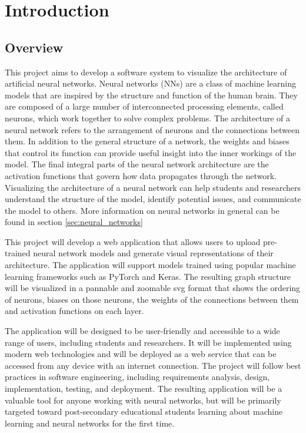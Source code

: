 \section{Introduction}
\label{sec:Introduction}

\subsection{Overview} 
This project aims to develop a software system to visualize the architecture of artificial neural networks. Neural networks (NNs) are a class of machine learning models that are inspired by the structure and function of the human brain. They are composed of a large number of interconnected processing elements, called neurons, which work together to solve complex problems. The architecture of a neural network refers to the arrangement of neurons and the connections between them. In addition to the general structure of a network, the weights and biases that control its function can provide useful insight into the inner workings of the model. The final integral parts of the neural network architecture are the activation functions that govern how data propagates through the network. Visualizing the architecture of a neural network can help students and researchers understand the structure of the model, identify potential issues, and communicate the model to others. More information on neural networks in general can be found in section \ref{sec:neural_networks}

This project will develop a web application that allows users to upload pre-trained neural network models and generate visual representations of their architecture. The application will support models trained using popular machine learning frameworks such as PyTorch and Keras. The resulting graph structure will be visualized in a pannable and zoomable svg format that shows the ordering of neurons, biases on those neurons, the weights of the connections between them and activation functions on each layer.

The application will be designed to be user-friendly and accessible to a wide range of users, including students and researchers. It will be implemented using modern web technologies and will be deployed as a web service that can be accessed from any device with an internet connection. The project will follow best practices in software engineering, including requirements analysis, design, implementation, testing, and deployment. The resulting application will be a valuable tool for anyone working with neural networks, but will be primarily targeted toward post-secondary educational students learning about machine learning and neural networks for the first time.

